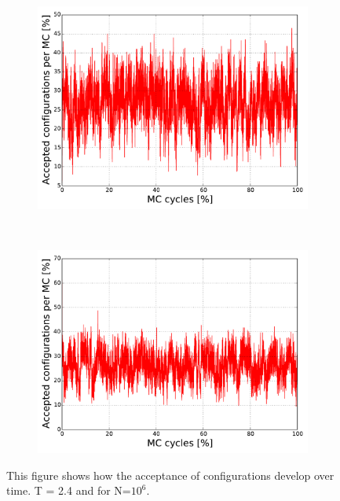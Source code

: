 \begin{figure}[H]
    \centering
    \begin{subfigure}{0.5\textwidth}
        \centering
        \includegraphics[width=\linewidth]{result/bilder/config/energy22-MC1000000T24-configN20}
        \caption{}
    \end{subfigure}%
    ~ 
    \begin{subfigure}{0.5\textwidth}
        \centering
        \includegraphics[width=\linewidth]{result/bilder/config/energy22-MC1000000T24-config-RNGN20}
        \caption{}
    \end{subfigure}
    \caption{This figure shows how the acceptance of configurations develop over time. T = 2.4 and for N=$10^6$. }
    \label{fig:config-T24}
\end{figure}


